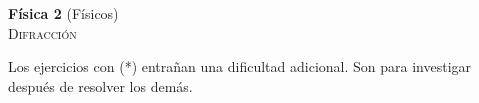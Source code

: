 \documentclass[11pt,spanish,a4paper]{article}
\begin{document}
\begin{center}
	\textbf{Física 2} (Físicos) \hfill {}\\
	\textsc{\LARGE Difracción}
\end{center}

Los ejercicios con (*) entrañan una dificultad adicional. Son para investigar después de resolver los demás.


\begin{enumerate}





\end{enumerate}
\end{document}
